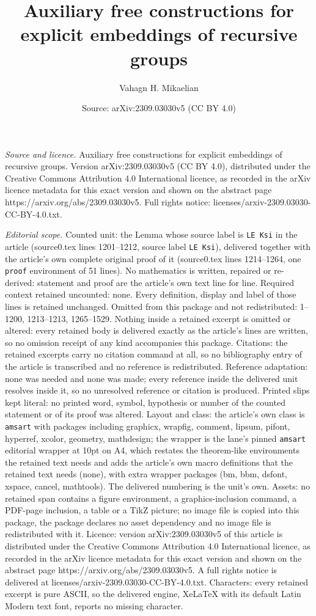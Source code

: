 \documentclass[10pt,a4paper]{amsart}
\title[Auxiliary free constructions for explicit embeddings of recu]{Auxiliary free constructions for explicit embeddings of recursive groups}
\author{Vahagn H. Mikaelian}
\date{Source: arXiv:2309.03030v5 (CC BY 4.0)}
\begin{document}
\maketitle

\noindent\emph{Source and licence.} Auxiliary free constructions for explicit embeddings of recursive groups. Version arXiv:2309.03030v5 (CC BY 4.0), distributed under the Creative Commons Attribution 4.0 International licence, as recorded in the arXiv licence metadata for this exact version and shown on the abstract page https://arxiv.org/abs/2309.03030v5. Full rights notice: licenses/arxiv-2309.03030-CC-BY-4.0.txt.\par\smallskip

\noindent\textit{Editorial scope.} Counted unit: the Lemma whose source label is \texttt{LE Ksi} in the article (source0.tex lines 1201--1212, source label \texttt{LE Ksi}), delivered together with the article's own complete original proof of it (source0.tex lines 1214--1264, one \texttt{proof} environment of 51 lines). No mathematics is written, repaired or re-derived: statement and proof are the article's own text line for line. Required context retained uncounted: none. Every definition, display and label of those lines is retained unchanged. Omitted from this package and not redistributed: 1--1200, 1213--1213, 1265--1529. Nothing inside a retained excerpt is omitted or altered: every retained body is delivered exactly as the article's lines are written, so no omission receipt of any kind accompanies this package. Citations: the retained excerpts carry no citation command at all, so no bibliography entry of the article is transcribed and no reference is redistributed. Reference adaptation: none was needed and none was made; every reference inside the delivered unit resolves inside it, so no unresolved reference or citation is produced. Printed slips kept literal: no printed word, symbol, hypothesis or number of the counted statement or of its proof was altered. Layout and class: the article's own class is \texttt{amsart} with packages including graphicx, wrapfig, comment, lipsum, pifont, hyperref, xcolor, geometry, mathdesign; the wrapper is the lane's pinned \texttt{amsart} editorial wrapper at 10pt on A4, which restates the theorem-like environments the retained text needs and adds the article's own macro definitions that the retained text needs (none), with extra wrapper packages (bm, bbm, dsfont, xspace, cancel, mathtools). The delivered numbering is the unit's own. Assets: no retained span contains a figure environment, a graphics-inclusion command, a PDF-page inclusion, a table or a TikZ picture; no image file is copied into this package, the package declares no asset dependency and no image file is redistributed with it. Licence: version arXiv:2309.03030v5 of this article is distributed under the Creative Commons Attribution 4.0 International licence, as recorded in the arXiv licence metadata for this exact version and shown on the abstract page https://arxiv.org/abs/2309.03030v5. A full rights notice is delivered at licenses/arxiv-2309.03030-CC-BY-4.0.txt. Characters: every retained excerpt is pure ASCII, so the delivered engine, XeLaTeX with its default Latin Modern text font, reports no missing character.
\end{document}
